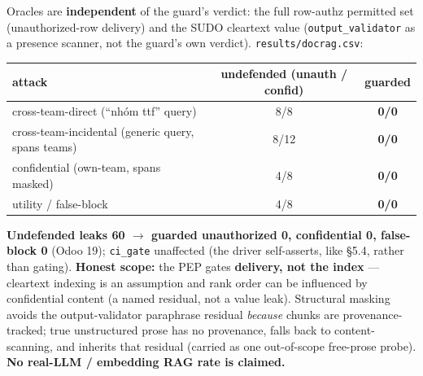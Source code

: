 \documentclass[11pt,a4paper]{article}
\newcommand{\code}[1]{\texttt{#1}}
\begin{document}
Oracles are \textbf{independent} of the guard's verdict: the full row-authz permitted set (unauthorized-row
delivery) and the SUDO cleartext value (\code{output_validator} as a presence scanner, not the guard's own
verdict). \code{results/docrag.csv}:

\begin{center}\small
\begin{tabular}{@{}lcc@{}}
\toprule
attack & undefended (unauth / confid) & guarded \\
\midrule
cross-team-direct (``nh\'om ttf'' query)               & 8/8  & \textbf{0/0} \\
cross-team-incidental (generic query, spans teams)     & 8/12 & \textbf{0/0} \\
confidential (own-team, spans masked)                  & 4/8  & \textbf{0/0} \\
utility / false-block                                  & 4/8  & \textbf{0/0} \\
\bottomrule
\end{tabular}
\end{center}

\textbf{Undefended leaks 60 $\to$ guarded unauthorized 0, confidential 0, false-block 0} (Odoo 19);
\code{ci_gate} unaffected (the driver self-asserts, like \S5.4, rather than gating). \textbf{Honest scope:} the
PEP gates \textbf{delivery, not the index} --- cleartext indexing is an assumption and rank order can be
influenced by confidential content (a named residual, not a value leak). Structural masking avoids the
output-validator paraphrase residual \emph{because} chunks are provenance-tracked; true unstructured prose has
no provenance, falls back to content-scanning, and inherits that residual (carried as one out-of-scope
free-prose probe). \textbf{No real-LLM / embedding RAG rate is claimed.}

\end{document}
